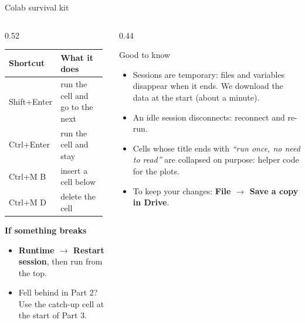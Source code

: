 \begin{frame}{Colab survival kit}
  \begin{columns}[T]
    \begin{column}{0.52\linewidth}
      \small
      \begin{tabular}{@{}>{\ttfamily}p{0.38\linewidth}p{0.58\linewidth}@{}}
        \toprule
        \textrm{\textbf{Shortcut}} & \textbf{What it does}\\\midrule
        Shift+Enter & run the cell and go to the next\\
        Ctrl+Enter & run the cell and stay\\
        Ctrl+M B & insert a cell below\\
        Ctrl+M D & delete the cell\\
        \bottomrule
      \end{tabular}
      \vspace{0.3cm}

      \textbf{If something breaks}
      \begin{itemize}\footnotesize\setlength\itemsep{2pt}
        \item \textbf{Runtime $\rightarrow$ Restart session}, then run from the top.
        \item Fell behind in Part 2? Use the \alert{catch-up cell} at the start of Part 3.
      \end{itemize}
    \end{column}
    \begin{column}{0.44\linewidth}
      \begin{block}{Good to know}
        \footnotesize
        \begin{itemize}\setlength\itemsep{3pt}
          \item Sessions are \alert{temporary}: files and variables disappear when it ends. We download the data at the start (about a minute).
          \item An idle session disconnects: reconnect and re-run.
          \item Cells whose title ends with \emph{``run once, no need to read''} are collapsed on purpose: helper code for the plots.
          \item To keep your changes: \textbf{File $\rightarrow$ Save a copy in Drive}.
        \end{itemize}
      \end{block}
    \end{column}
  \end{columns}
\end{frame}

